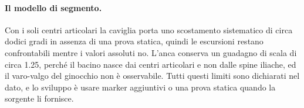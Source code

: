 \paragraph{Il modello di segmento.} Con i soli centri articolari la caviglia porta
uno scostamento sistematico di circa dodici gradi in assenza di una prova statica,
quindi le escursioni restano confrontabili mentre i valori assoluti no. L'anca
conserva un guadagno di scala di circa 1.25, perché il bacino nasce dai centri
articolari e non dalle spine iliache, ed il varo-valgo del ginocchio non è
osservabile. Tutti questi limiti sono dichiarati nel dato, e lo sviluppo è usare
marker aggiuntivi o una prova statica quando la sorgente li fornisce.

